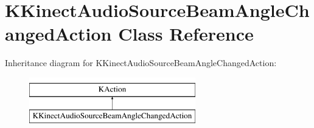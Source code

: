 \hypertarget{class_k_kinect_audio_source_beam_angle_changed_action}{\section{\-K\-Kinect\-Audio\-Source\-Beam\-Angle\-Changed\-Action \-Class \-Reference}
\label{class_k_kinect_audio_source_beam_angle_changed_action}
}
\-Inheritance diagram for \-K\-Kinect\-Audio\-Source\-Beam\-Angle\-Changed\-Action\-:\begin{figure}[H]
\begin{center}
\leavevmode
\includegraphics[height=2.000000cm]{class_k_kinect_audio_source_beam_angle_changed_action}
\end{center}
\end{figure}
